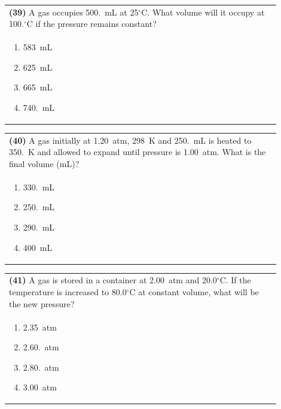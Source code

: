 \documentclass{article}
\begin{document}
{{\vspace{0.2cm}
\noindent\begin{tabular}{|p{0.9\linewidth}|}
\hline
\textbf{(39)} A gas occupies 500.~mL at 25$^\circ$C. What volume will it occupy at 100.$^\circ$C if the pressure remains constant? \\[0.2cm]

\begin{minipage}[t]{0.85\linewidth}
\begin{enumerate}[label=\alph*.]
\item 583~mL
\item 625~mL
\item 665~mL
\item 740.~mL
\end{enumerate}
\end{minipage}\\[0.2cm]
\hline
\end{tabular}

\vspace{0.2cm}
\noindent\begin{tabular}{|p{0.9\linewidth}|}
\hline
\textbf{(40)} A gas initially at 1.20~atm, 298~K and 250.~mL is heated to 350.~K and allowed to expand until pressure is 1.00~atm. What is the final volume (mL)?\\[0.2cm]

\begin{minipage}[t]{0.85\linewidth}
\begin{enumerate}[label=\alph*.]
\item 330.~mL
\item 250.~mL
\item 290.~mL
\item 400~mL
\end{enumerate}
\end{minipage}\\[0.2cm]
\hline
\end{tabular}

\newpage

\noindent\begin{tabular}{|p{0.9\linewidth}|}
\hline
\textbf{(41)} A gas is stored in a container at 2.00~atm and 20.0$^\circ$C. If the temperature is increased to 80.0$^\circ$C at constant volume, what will be the new pressure? \\[0.2cm]

\begin{minipage}[t]{0.85\linewidth}
\begin{enumerate}[label=\alph*.]
\item 2.35~atm
\item 2.60.~atm
\item 2.80.~atm
\item 3.00~atm
\end{enumerate}
\end{minipage}\\[0.2cm]
\hline
\end{tabular}

}}
\end{document}
